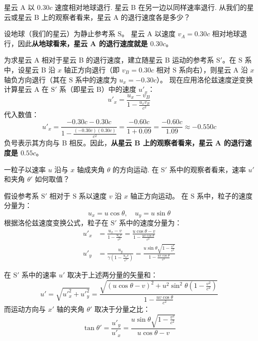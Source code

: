 \begin{exercise}\label{ex:9.11}
星云 A 以 $0.30c$ 速度相对地球退行. 星云 B 在另一边以同样速率退行. 从我们的星云或星云 B 上的观察者看来，星云 A 的退行速度各是多少？
\end{exercise}
\begin{solution}
设地球（我们的星云）为静止参考系 $\mathrm{S}$。
星云 A 以速度 $v_A = 0.30c$ 相对地球退行，因此\textbf{从地球看来，星云 A 的退行速度就是 $0.30c$}。

为求星云 A 相对于星云 B 的退行速度，建立随星云 B 运动的参考系 $\mathrm{S}'$。在 $\mathrm{S}$ 系中，设星云 B 沿 $x$ 轴正方向退行（即 $v_B = 0.30c$ 相对 $\mathrm{S}$ 系向右），则星云 A 沿 $x$ 轴负方向退行（其在 $\mathrm{S}$ 系中的速度为 $u_x = -0.30c$）。
现在应用洛伦兹速度逆变换计算星云 A 在 $\mathrm{S}'$ 系（即星云 B）中的速度 $u'_x$：
$$ u'_x = \frac{u_x - v_B}{1 - \frac{u_x v_B}{c^2}} $$
代入数值：
$$ u'_x = \frac{-0.30c - 0.30c}{1 - \frac{(-0.30c)(0.30c)}{c^2}} = \frac{-0.60c}{1 + 0.09} = \frac{-0.60c}{1.09} \approx -0.550c $$
负号表示其方向与 B 相反。因此，\textbf{从星云 B 上的观察者看来，星云 A 的退行速度是 $0.55c$}。
\end{solution}

\begin{exercise}\label{ex:9.12}
一粒子以速率 $u$ 沿与 $x$ 轴成夹角 $\theta$ 的方向运动. 在 S$'$ 系中的观察者看来，速率 $u'$ 和夹角 $\theta'$ 如何取值？
\end{exercise}
\begin{solution}
假设参考系 $\mathrm{S}'$ 相对于 $\mathrm{S}$ 系以速度 $v$ 沿 $x$ 轴正方向运动。
在 $\mathrm{S}$ 系中，粒子的速度分量为：
$$ u_x = u \cos\theta, \quad u_y = u \sin\theta $$
根据洛伦兹速度变换公式，粒子在 $\mathrm{S}'$ 系中的速度分量为：
\begin{align*}
    u'_x &= \frac{u_x - v}{1 - \frac{u_x v}{c^2}} = \frac{u \cos\theta - v}{1 - \frac{u v \cos\theta}{c^2}} \\
    u'_y &= \frac{u_y}{\gamma \left( 1 - \frac{u_x v}{c^2} \right)} = \frac{u \sin\theta \sqrt{1 - \frac{v^2}{c^2}}}{1 - \frac{u v \cos\theta}{c^2}}
\end{align*}

在 $\mathrm{S}'$ 系中的速率 $u'$ 取决于上述两分量的矢量和：
$$ u' = \sqrt{u'^2_x + u'^2_y} = \frac{\sqrt{(u \cos\theta - v)^2 + u^2 \sin^2\theta \left(1 - \frac{v^2}{c^2}\right)}}{1 - \frac{u v \cos\theta}{c^2}} $$
而运动方向与 $x'$ 轴的夹角 $\theta'$ 取决于分量之比：
$$ \tan\theta' = \frac{u'_y}{u'_x} = \frac{u \sin\theta \sqrt{1 - \frac{v^2}{c^2}}}{u \cos\theta - v} $$
\end{solution}

